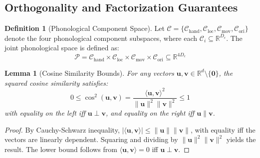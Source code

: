 \documentclass[sigconf,nonacm,anonymous]{acmart}
\newtheorem{lemma}[theorem]{Lemma}
\theoremstyle{definition}
\newtheorem{definition}[theorem]{Definition}
\theoremstyle{remark}
\begin{document}
\subsection{Orthogonality and Factorization Guarantees}

\begin{definition}[Phonological Component Space]
\label{def:component_space}
Let $\mathcal{C} = \{\mathcal{C}_{\text{hand}}, \mathcal{C}_{\text{loc}}, \mathcal{C}_{\text{mov}}, \mathcal{C}_{\text{ori}}\}$ denote the four phonological component subspaces, where each $\mathcal{C}_i \subseteq \mathbb{R}^{D_c}$. The joint phonological space is defined as:
\begin{equation}
\mathcal{P} = \mathcal{C}_{\text{hand}} \times \mathcal{C}_{\text{loc}} \times \mathcal{C}_{\text{mov}} \times \mathcal{C}_{\text{ori}} \subseteq \mathbb{R}^{4D_c}
\end{equation}
\end{definition}

\begin{lemma}[Cosine Similarity Bounds]
\label{lemma:cosine_bounds}
For any vectors $\mathbf{u}, \mathbf{v} \in \mathbb{R}^d \setminus \{\mathbf{0}\}$, the squared cosine similarity satisfies:
\begin{equation}
0 \leq \cos^2(\mathbf{u}, \mathbf{v}) = \frac{\langle \mathbf{u}, \mathbf{v} \rangle^2}{\|\mathbf{u}\|^2 \|\mathbf{v}\|^2} \leq 1
\end{equation}
with equality on the left iff $\mathbf{u} \perp \mathbf{v}$, and equality on the right iff $\mathbf{u} \parallel \mathbf{v}$.
\end{lemma}

\begin{proof}
By Cauchy-Schwarz inequality, $|\langle \mathbf{u}, \mathbf{v} \rangle| \leq \|\mathbf{u}\| \|\mathbf{v}\|$, with equality iff the vectors are linearly dependent. Squaring and dividing by $\|\mathbf{u}\|^2 \|\mathbf{v}\|^2$ yields the result. The lower bound follows from $\langle \mathbf{u}, \mathbf{v} \rangle = 0$ iff $\mathbf{u} \perp \mathbf{v}$.
\end{proof}
\end{document}
